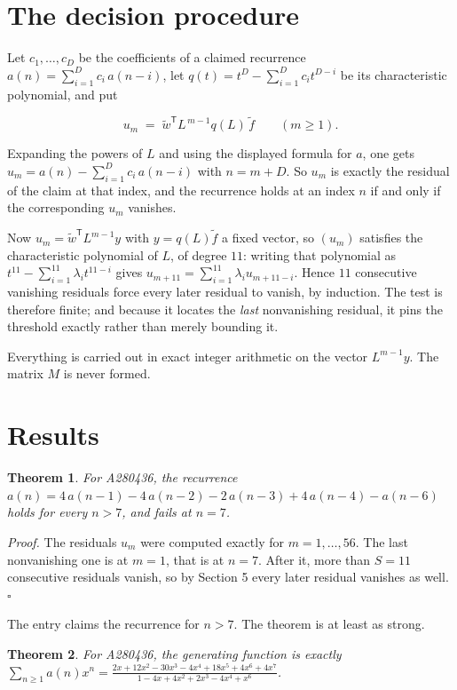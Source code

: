 \documentclass[11pt]{article}
\newtheorem{theorem}{Theorem}
\theoremstyle{definition}
\begin{document}
\section{The decision procedure}

Let $c_1,\dots,c_D$ be the coefficients of a claimed recurrence $a(n) = \sum_{i=1}^{D} c_i\,a(n-i)$, let $q(t) = t^{D} - \sum_{i=1}^{D} c_i t^{D-i}$ be its characteristic polynomial, and put

\[u_m \;=\; \tilde w^{\mathsf T} L^{\,m-1} q(L)\,\tilde f \qquad (m \ge 1).\]

Expanding the powers of $L$ and using the displayed formula for $a$, one gets $u_m = a(n) - \sum_{i=1}^{D} c_i\,a(n-i)$ with $n = m + D$. So $u_m$ is exactly the residual of the claim at that index, and the recurrence holds at an index $n$ if and only if the corresponding $u_m$ vanishes.

Now $u_m = \tilde w^{\mathsf T} L^{m-1} y$ with $y = q(L)\tilde f$ a fixed vector, so $(u_m)$ satisfies the characteristic polynomial of $L$, of degree $11$: writing that polynomial as $t^{11} - \sum_{i=1}^{11} \lambda_i t^{11-i}$ gives $u_{m+11} = \sum_{i=1}^{11} \lambda_i u_{m+11-i}$. Hence $11$ consecutive vanishing residuals force every later residual to vanish, by induction. The test is therefore finite; and because it locates the {\itshape last} nonvanishing residual, it pins the threshold exactly rather than merely bounding it.

Everything is carried out in exact integer arithmetic on the vector $L^{m-1}y$. The matrix $M$ is never formed.

\section{Results}

\begin{theorem} For A280436, the recurrence $a(n) = 4\,a(n-1) - 4\,a(n-2) - 2\,a(n-3) + 4\,a(n-4) - a(n-6)$ holds for every $n > 7$, and fails at $n = 7$.\end{theorem}

{\itshape Proof.} The residuals $u_m$ were computed exactly for $m = 1,\dots,56$. The last nonvanishing one is at $m = 1$, that is at $n = 7$. After it, more than $S = 11$ consecutive residuals vanish, so by Section 5 every later residual vanishes as well. $\square$

The entry claims the recurrence for $n > 7$. The theorem is at least as strong.

\begin{theorem} For A280436, the generating function is exactly $\sum_{n\ge 1} a(n)x^n = \frac{2x + 12x^{2} - 30x^{3} - 4x^{4} + 18x^{5} + 4x^{6} + 4x^{7}}{1 - 4x + 4x^{2} + 2x^{3} - 4x^{4} + x^{6}}$.\end{theorem}
\end{document}
